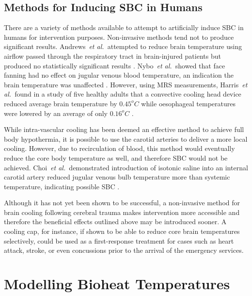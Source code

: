 \documentclass[11pt,english,a4paper,twoside,openright]{report}
\begin{document}
{{{{{{{{	\subsection{Methods for Inducing SBC in Humans}
	
	There are a variety of methods available to attempt to artificially induce SBC in humans for intervention purposes. Non-invasive methods tend not to produce significant results. Andrews~\textit{et al.\ }attempted to reduce brain temperature using airflow passed through the respiratory tract in brain-injured patients but produced no statistically significant results \cite{andrews2005randomized}. Nybo~\textit{et al.\ }showed that face fanning had no effect on jugular venous blood temperature, an indication the brain temperature was unaffected \cite{nybo2002inadequate}. However, using MRS measurements, Harris~\textit{et al.\ }found in a study of five healthy adults that a convective cooling head device reduced average brain temperature by $0.45^{o}C$ while oesophageal temperatures were lowered by an average of only $0.16^{o}C$ \cite{harris2008forced}.
	
	While intra-vascular cooling has been deemed an effective method to achieve full body hypothermia, it is possible to use the carotid arteries to deliver a more local cooling. However, due to recirculation of blood, this method would eventually reduce the core body temperature as well, and therefore SBC would not be achieved. Choi~\textit{et al.\ }demonstrated introduction of isotonic saline into an internal carotid artery reduced jugular venous bulb temperature more than systemic temperature, indicating possible SBC \cite{choi2010selective}.
	
	Although it has not yet been shown to be successful, a non-invasive method for brain cooling following cerebral trauma makes intervention more accessible and therefore the beneficial effects outlined above may be introduced sooner. A cooling cap, for instance, if shown to be able to reduce core brain temperatures selectively, could be used as a first-response treatment for cases such as heart attack, stroke, or even concussions prior to the arrival of the emergency services.  
	
	\section[Modelling Bioheat Temperatures]{{\Large M}odelling {\Large B}ioheat {\Large T}emperatures}
	
}}}}}}}}
\end{document}
